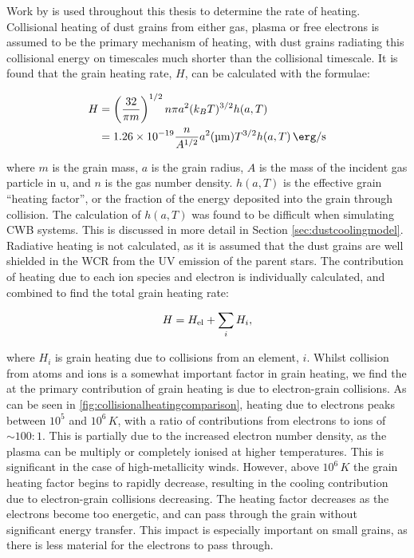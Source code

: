 Work by \textcite{dwek_infrared_1981} is used throughout this thesis to determine the rate of heating.
Collisional heating of dust grains from either gas, plasma or free electrons is assumed to be the primary mechanism of heating, with dust grains radiating this collisional energy on timescales much shorter than the collisional timescale.
It is found that the grain heating rate, $H$, can be calculated with the formulae:

\begin{equation}
  \label{eq:grainheatingrate}
  \begin{split}
    H & = \left(\frac{32}{\pi m}\right)^{1/2} n\pi a^2 (k_B T)^{3/2} h(a,T) \\
    & = \num{1.26e-19} \frac{n}{A^{1/2}} a^2 (\si{\micro\metre}) T^{3/2} h(a,T) \, \si{\erg\per\second}
  \end{split}
\end{equation}

\noindent
where $m$ is the grain mass, $a$ is the grain radius, $A$ is the mass of the incident gas particle in \si{\atomicmassunit}, and $n$ is the gas number density.
$h(a,T)$ is the effective grain ``heating factor'', or the fraction of the energy deposited into the grain through collision.
The calculation of $h(a,T)$ was found to be difficult when simulating CWB systems.
This is discussed in more detail in Section \ref{sec:dustcoolingmodel}.
Radiative heating is not calculated, as it is assumed that the dust grains are well shielded in the WCR from the UV emission of the parent stars.
The contribution of heating due to each ion species and electron is individually calculated, and combined to find the total grain heating rate:

\begin{equation}
  H = H_\text{el} + \sum_i H_i , 
\end{equation}

\noindent
where $H_i$ is grain heating due to collisions from an element, $i$.
Whilst collision from atoms and ions is a somewhat important factor in grain heating, we find the at the primary contribution of grain heating is due to electron-grain collisions.
As can be seen in \ref{fig:collisionalheatingcomparison}, heating due to electrons peaks between $10^5$ and $10^6 \, \si{K}$, with a ratio of contributions from electrons to ions of $\sim 100 : 1$.
This is partially due to the increased electron number density, as the plasma can be multiply or completely ionised at higher temperatures.
This is significant in the case of high-metallicity winds.
However, above $10^6\,\si{K}$ the grain heating factor begins to rapidly decrease, resulting in the cooling contribution due to electron-grain collisions decreasing.
The heating factor decreases as the electrons become too energetic, and can pass through the grain without significant energy transfer.
This impact is especially important on small grains, as there is less material for the electrons to pass through.

